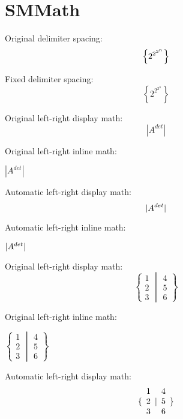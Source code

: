 \documentclass[class=scrartcl,crop=false]{standalone}
\begin{document}
\section{SMMath}


Original delimiter spacing:
\[
    \originalleft\{ 2^{2^{2^n}} \originalright\}
\]

Fixed delimiter spacing:
\[ \left\{ 2^{2^{2^n}} \right\} \]


Original left-right display math:
\[
    \left|A^{det}\right|
\]

Original left-right inline math:
\begin{center}
\(
    \left|A^{det}\right|
\)
\end{center}

Automatic left-right display math:
\[
    \card{A^{det}}
\]

Automatic left-right inline math:
\begin{center}
\(
    \card{A^{det}}
\)
\end{center}


Original left-right display math:
\[
    \left\{
        \begin{array}{l} 1 \\ 2 \\ 3 \end{array}
        \middle|
        \begin{array}{l} 4 \\ 5 \\ 6 \end{array}
    \right\}
\]

Original left-right inline math:
\begin{center}
\(
    \left\{
        \begin{array}{l} 1 \\ 2 \\ 3 \end{array}
        \middle|
        \begin{array}{l} 4 \\ 5 \\ 6 \end{array}
    \right\}
\)
\end{center}

Automatic left-right display math:
\[
    \set{
        \begin{array}{l} 1 \\ 2 \\ 3 \end{array}
        \mdl|
        \begin{array}{l} 4 \\ 5 \\ 6 \end{array}
    }
\]
\end{document}
